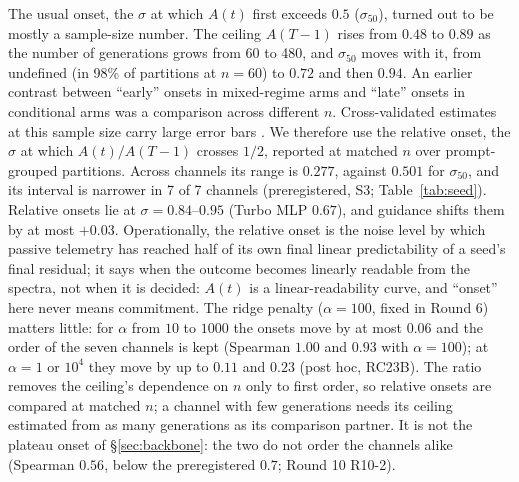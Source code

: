 \documentclass[11pt]{article}
\begin{document}
The usual onset, the $\sigma$ at which $A(t)$ first exceeds $0.5$ ($\sigma_{50}$), turned out to be mostly a sample-size number. The ceiling $A(T-1)$ rises from $0.48$ to $0.89$ as the number of generations grows from 60 to 480, and $\sigma_{50}$ moves with it, from undefined (in 98\% of partitions at $n=60$) to $0.72$ and then $0.94$. An earlier contrast between ``early'' onsets in mixed-regime arms and ``late'' onsets in conditional arms was a comparison across different $n$. Cross-validated estimates at this sample size carry large error bars \citep{varoquaux2018cross}. We therefore use the relative onset, the $\sigma$ at which $A(t)/A(T-1)$ crosses $1/2$, reported at matched $n$ over prompt-grouped partitions. Across channels its range is $0.277$, against $0.501$ for $\sigma_{50}$, and its interval is narrower in 7 of 7 channels (preregistered, S3; Table~\ref{tab:seed}). Relative onsets lie at $\sigma=0.84$--$0.95$ (Turbo MLP $0.67$), and guidance shifts them by at most $+0.03$. Operationally, the relative onset is the noise level by which passive telemetry has reached half of its own final linear predictability of a seed's final residual; it says when the outcome becomes linearly readable from the spectra, not when it is decided: $A(t)$ is a linear-readability curve, and ``onset'' here never means commitment. The ridge penalty ($\alpha=100$, fixed in Round 6) matters little: for $\alpha$ from $10$ to $1000$ the onsets move by at most $0.06$ and the order of the seven channels is kept (Spearman $1.00$ and $0.93$ with $\alpha=100$); at $\alpha=1$ or $10^4$ they move by up to $0.11$ and $0.23$ (post hoc, RC23B). The ratio removes the ceiling's dependence on $n$ only to first order, so relative onsets are compared at matched $n$; a channel with few generations needs its ceiling estimated from as many generations as its comparison partner. It is not the plateau onset of \S\ref{sec:backbone}: the two do not order the channels alike (Spearman $0.56$, below the preregistered $0.7$; Round 10 R10-2).
\end{document}

